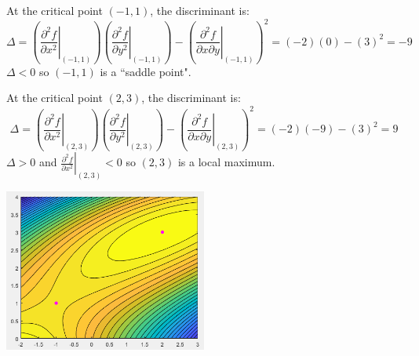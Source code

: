 \documentclass{article}
\begin{document}
\begin{itemize}
At the critical point \((-1,1)\), the discriminant is:
\[\Delta = \left(\left.\frac{\partial^2 f}{\partial x^2}\right|_{(-1,1)}\right)\left(\left.\frac{\partial^2 f}{\partial y^2}\right|_{(-1,1)}\right) - \left(\left.\frac{\partial^2 f}{\partial x \partial y}\right|_{(-1,1)}\right)^2 = (-2)(0) - (3)^2 = -9\]
\(\Delta < 0\) so \((-1, 1)\) is a ``saddle point".

At the critical point \((2,3)\), the discriminant is:
\[\Delta = \left(\left.\frac{\partial^2 f}{\partial x^2}\right|_{(2,3)}\right)\left(\left.\frac{\partial^2 f}{\partial y^2}\right|_{(2,3)}\right) - \left(\left.\frac{\partial^2 f}{\partial x \partial y}\right|_{(2,3)}\right)^2 = (-2)(-9) - (3)^2 = 9\]
\(\Delta > 0\) and \(\left.\frac{\partial^2 f}{\partial x^2}\right|_{(2,3)} < 0\) so \((2, 3)\) is a local maximum.

\begin{center}
\includegraphics[width = 0.5\textwidth]{critical_points_2.png}
\end{center}


\end{itemize}
\end{document}
